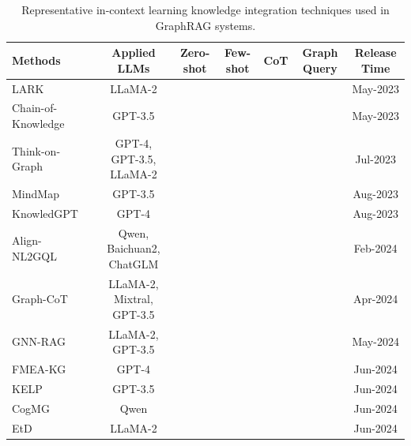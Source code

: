 \documentclass[lettersize,journal]{IEEEtran}
\newcommand{\cmark}{\ding{51}}%
\newcommand{\xmark}{\ding{55}}%
\begin{document}
\begin{table}[!t]
    \centering
    \caption{Representative in-context learning knowledge integration techniques used in GraphRAG systems.}
    \vspace{-2mm}
    \begin{tabular}{lcccccc}
    \toprule
    \textbf{Methods} & \textbf{Applied LLMs} & \textbf{Zero-shot} & \textbf{Few-shot} & \textbf{CoT} & \textbf{Graph Query} & \textbf{Release Time} \\
    \midrule
    LARK~\cite{choudhary2023complex} & LLaMA-2 & \xmark & \xmark & \cmark & \cmark & May-2023 \\
    Chain-of-Knowledge~\cite{li2024chainofknowledge} & GPT-3.5 &  \xmark & \cmark & \cmark &  \xmark & May-2023 \\
    Think-on-Graph~\cite{sun2024thinkongraph} & GPT-4, GPT-3.5, LLaMA-2 &  \xmark & \cmark & \cmark &  \xmark & Jul-2023 \\
    MindMap~\cite{wen2023mindmap} & GPT-3.5 & \cmark & \cmark & \cmark & \xmark & Aug-2023 \\
    KnowledGPT~\cite{wang2023knowledgpt} & GPT-4 & \cmark &  \xmark & \cmark & \cmark & Aug-2023 \\
    Align-NL2GQL~\cite{liang2024aligning} & Qwen, Baichuan2, ChatGLM & \xmark & \xmark & \xmark & \cmark & Feb-2024 \\
    Graph-CoT~\cite{jin2024graph} & LLaMA-2, Mixtral, GPT-3.5 & \xmark & \cmark & \cmark & \xmark & Apr-2024 \\
    GNN-RAG~\cite{mavromatis2024gnn} & LLaMA-2, GPT-3.5 & \cmark & \xmark & \xmark & \xmark & May-2024 \\
    FMEA-KG~\cite{bahr2024knowledge} & GPT-4 & \xmark & \xmark & \xmark & \cmark & Jun-2024 \\
    KELP~\cite{liu2024knowledge} & GPT-3.5 & \xmark & \cmark & \xmark & \xmark & Jun-2024 \\
    CogMG~\cite{zhou2024cogmg} & Qwen & \xmark & \cmark & \xmark & \xmark & Jun-2024 \\
    EtD~\cite{liu2024explore} & LLaMA-2 & \cmark & \xmark & \xmark & \xmark & Jun-2024 \\
    \bottomrule
    \end{tabular}
    \label{tab:methods}
    \vspace{-5mm}
\end{table}
\end{document}
